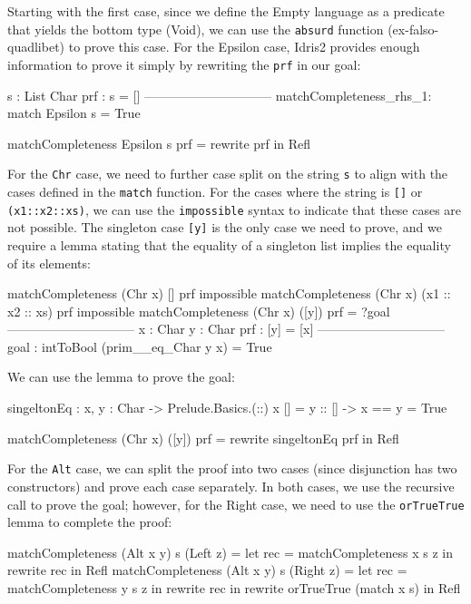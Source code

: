 \documentclass[]{rptuseminar}
\begin{document}
Starting with the first case, since we define the Empty language as a predicate that yields the bottom type (Void), we can use the \texttt{absurd} function (ex-falso-quadlibet) to prove this case. For the Epsilon case, Idris2 provides enough information to prove it simply by rewriting the \texttt{prf} in our goal:

\begin{idris}
s : List Char
prf : s = []
------------------------------
matchCompleteness_rhs_1: match Epsilon s = True

matchCompleteness Epsilon s prf = rewrite prf in Refl
\end{idris}

For the \texttt{Chr} case, we need to further case split on the string \texttt{s} to align with the cases defined in the \texttt{match} function. For the cases where the string is \texttt{[]} or \texttt{(x1::x2::xs)}, we can use the \texttt{impossible} syntax to indicate that these cases are not possible. The singleton case \texttt{[y]} is the only case we need to prove, and we require a lemma stating that the equality of a singleton list implies the equality of its elements:

\begin{idris}
matchCompleteness (Chr x) [] prf impossible 
matchCompleteness (Chr x) (x1 :: x2 :: xs) prf impossible 
matchCompleteness (Chr x) ([y]) prf = ?goal
------------------------------
x : Char
y : Char
prf : [y] = [x]
------------------------------
goal : intToBool (prim__eq_Char y x) = True
\end{idris}

We can use the lemma to prove the goal:

\begin{idris}
singeltonEq : {x, y : Char} -> Prelude.Basics.(::) x [] = y :: [] -> x == y = True

matchCompleteness (Chr x) ([y]) prf = rewrite singeltonEq prf in Refl
\end{idris}

For the \texttt{Alt} case, we can split the proof into two cases (since disjunction has two constructors) and prove each case separately. In both cases, we use the recursive call to prove the goal; however, for the Right case, we need to use the \texttt{orTrueTrue} lemma to complete the proof:

\begin{idris}
matchCompleteness (Alt x y) s (Left z) = let rec = matchCompleteness x s z in 
    rewrite rec in Refl 
matchCompleteness (Alt x y) s (Right z) = let rec = matchCompleteness y s z in 
    rewrite rec in rewrite orTrueTrue (match x s) in Refl 
\end{idris}
\end{document}
